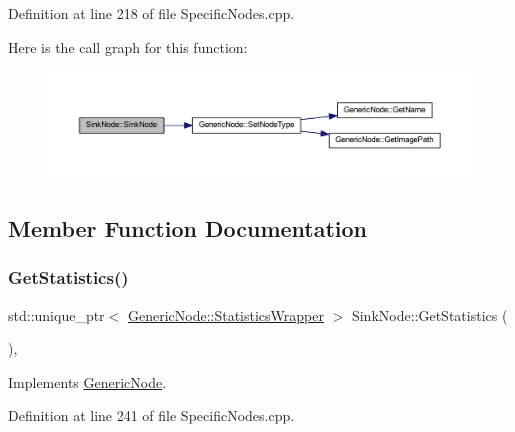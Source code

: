 Definition at line 218 of file Specific\+Nodes.\+cpp.

Here is the call graph for this function\+:
\nopagebreak
\begin{figure}[H]
\begin{center}
\leavevmode
\includegraphics[width=350pt]{class_sink_node_a0c3227da9d4ca0757f3512e4473c9b5c_cgraph}
\end{center}
\end{figure}


\subsection{Member Function Documentation}
\mbox{\label{class_sink_node_ad6aeb0857d3ddd9511cd5d24974e1fac}} 
\subsubsection{\texorpdfstring{Get\+Statistics()}{GetStatistics()}}
{\footnotesize\ttfamily std\+::unique\+\_\+ptr$<$ \hyperlink{class_generic_node_1_1_statistics_wrapper}{Generic\+Node\+::\+Statistics\+Wrapper} $>$ Sink\+Node\+::\+Get\+Statistics (\begin{DoxyParamCaption}{ }\end{DoxyParamCaption})\hspace{0.3cm}{\ttfamily [override]}, {\ttfamily [virtual]}}



Implements \hyperlink{class_generic_node_ae7c8424c8c14fd3de993c902d78deb67}{Generic\+Node}.



Definition at line 241 of file Specific\+Nodes.\+cpp.

